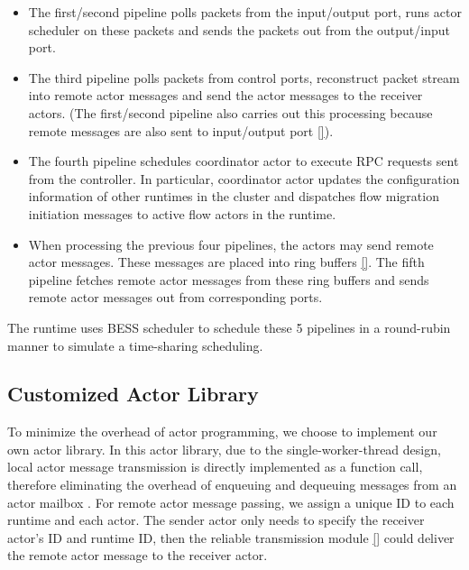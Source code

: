 \begin{itemize}

\item The first/second pipeline polls packets from the input/output port, runs actor scheduler on these packets and sends the packets out from the output/input port.

\item The third pipeline polls packets from control ports, reconstruct packet stream into remote actor messages and send the actor messages to the receiver actors. (The first/second pipeline also carries out this processing because remote messages are also sent to input/output port \ref{}).

\item The fourth pipeline schedules coordinator actor to execute RPC requests sent from the controller. In particular, coordinator actor updates the configuration information of other runtimes in the cluster and dispatches flow migration initiation messages to active flow actors in the runtime.

\item When processing the previous four pipelines, the actors may send remote actor messages. These messages are placed into ring buffers \ref{}. The fifth pipeline fetches remote actor messages from these ring buffers and sends remote actor messages out from corresponding ports.

\end{itemize}

The runtime uses BESS scheduler to schedule these 5 pipelines in a round-rubin manner to simulate a time-sharing scheduling.

\subsection{Customized Actor Library}
\label{sec:actor-library}

To minimize the overhead of actor programming, we choose to implement our own actor library. In this actor library, due to the single-worker-thread design, local actor message transmission is directly implemented as a function call, therefore eliminating the overhead of enqueuing and dequeuing messages from an actor mailbox \cite{}. For remote actor message passing, we assign a unique ID to each runtime and each actor. The sender actor only needs to specify the receiver actor's ID and runtime ID, then the reliable transmission module \ref{} could deliver the remote actor message to the receiver actor.

